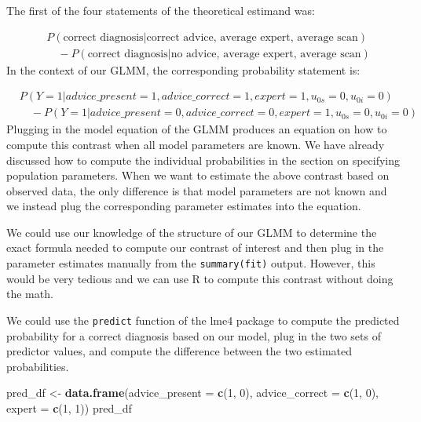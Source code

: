 \documentclass[
  man,floatsintext]{apa6}
\newenvironment{Shaded}{\begin{snugshade}}{\end{snugshade}}
\newcommand{\AttributeTok}[1]{\textcolor[rgb]{0.13,0.29,0.53}{#1}}
\newcommand{\DecValTok}[1]{\textcolor[rgb]{0.00,0.00,0.81}{#1}}
\newcommand{\FunctionTok}[1]{\textcolor[rgb]{0.13,0.29,0.53}{\textbf{#1}}}
\newcommand{\NormalTok}[1]{#1}
\newcommand{\OtherTok}[1]{\textcolor[rgb]{0.56,0.35,0.01}{#1}}
\begin{document}
The first of the four statements of the theoretical estimand was:

\[
\begin{aligned}
& P(\text{correct diagnosis} | \text{correct advice, average expert, average scan}) \\
& \quad - P(\text{correct diagnosis} | \text{no advice, average expert, average scan})
\end{aligned}
\]
In the context of our GLMM, the corresponding probability statement is:

\[
\begin{aligned}
& P(Y=1|advice\_present = 1, advice\_correct = 1, expert = 1, u_{0s} = 0, u_{0i} = 0) \\
& \quad - P(Y=1|advice\_present = 0, advice\_correct = 0, expert = 1, u_{0s} = 0, u_{0i} = 0)
\end{aligned}
\]
Plugging in the model equation of the GLMM produces an equation on how to compute this contrast when all model parameters are known.
We have already discussed how to compute the individual probabilities in the section on specifying population parameters.
When we want to estimate the above contrast based on observed data, the only difference is that model parameters are not known and we instead plug the corresponding parameter estimates into the equation.

We could use our knowledge of the structure of our GLMM to determine the exact formula needed to compute our contrast of interest and then plug in the parameter estimates manually from the \texttt{summary(fit)} output.
However, this would be very tedious and we can use R to compute this contrast without doing the math.

We could use the \texttt{predict} function of the lme4 package to compute the predicted probability for a correct diagnosis based on our model, plug in the two sets of predictor values, and compute the difference between the two estimated probabilities.

\begin{Shaded}
\begin{Highlighting}[]
\NormalTok{pred\_df }\OtherTok{\textless{}{-}} \FunctionTok{data.frame}\NormalTok{(}\AttributeTok{advice\_present =} \FunctionTok{c}\NormalTok{(}\DecValTok{1}\NormalTok{, }\DecValTok{0}\NormalTok{), }\AttributeTok{advice\_correct =} \FunctionTok{c}\NormalTok{(}\DecValTok{1}\NormalTok{, }\DecValTok{0}\NormalTok{), }
  \AttributeTok{expert =} \FunctionTok{c}\NormalTok{(}\DecValTok{1}\NormalTok{, }\DecValTok{1}\NormalTok{))}
\NormalTok{pred\_df}
\end{Highlighting}
\end{Shaded}
\end{document}
